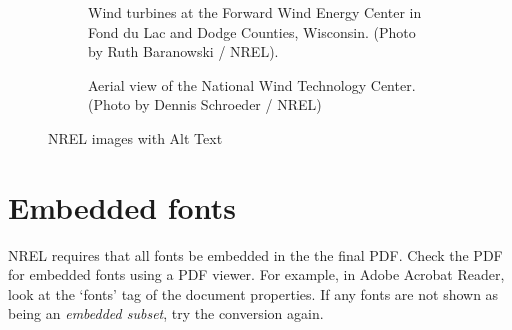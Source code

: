 \begin{figure}
          \begin{subfigure}[b]{.55\linewidth}
            \centering
		{}
            \caption{Wind turbines at the Forward Wind Energy Center in Fond du Lac and Dodge Counties, Wisconsin. (Photo by Ruth Baranowski / NREL).}\label{fig:21206WithAltText}
          \end{subfigure}%
          \begin{subfigure}[b]{.55\linewidth}
            \centering
		{}
            \caption{Aerial view of the National Wind Technology Center. (Photo by Dennis Schroeder / NREL)}\label{fig:20018WithAltText2}
          \end{subfigure}
          \caption{NREL images with Alt Text}\label{fig:NRELimagesWithAltText}
\end{figure}

\section{Embedded fonts}
NREL requires that all fonts be embedded in the the final PDF. Check the PDF for embedded fonts using a PDF viewer. For example, in Adobe Acrobat Reader, look at the `fonts' tag of the document properties. If any fonts are not shown as being an \emph{embedded subset}, try the conversion again. 

